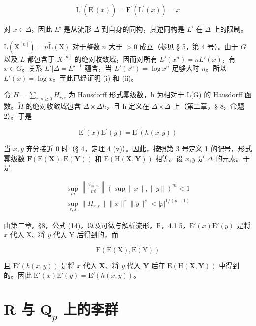 \[
\mathrm{L} ^ {\prime} (\mathrm{E} ^ {\prime} (x)) = \mathrm{E} ^ {\prime} (\mathrm{L} ^ {\prime} (x)) = x
\]

对 \(x \in \Delta\)。因此 \(E'\) 是从流形 \(\Delta\) 到自身的同构，其逆同构是 \(L'\) 在 \(\Delta\) 上的限制。

\(\mathrm{L}(\mathrm{X}^{[n]}) = n\tilde{\mathrm{L}}(\mathrm{X})\) 对于整数 \(n\) 大于 \(> 0\) 成立（参见 § 5，第 4 号）。由于 \(G\) 以及 \(L\) 都包含于 \(X^{[n]}\) 的绝对收敛域，因而对所有 \(L'(x^n) = nL'(x)\)，有 \(x \in G\)。关系 \(L'| \Delta = E'^{-1}\) 蕴含，当 \(L'(x^n) = \log x^n\) 足够大时 \(n\)。所以 \(L'(x) = \log x\)。至此已经证明 (i) 和 (ii)。

令 \(H = \sum_{r,s \geq 0} H_{r,s}\) 为 Hausdorff 形式幂级数，h 为相对于 L(G) 的 Hausdorff 函数。\(\tilde{H}\) 的绝对收敛域包含 \(\Delta \times \Delta\)\(h\)，且 h 定义在 \(\Delta \times \Delta\) 上（第二章，§ 8，命题 2）。于是

\[
\mathrm{E} ^ {\prime} (x) \mathrm{E} ^ {\prime} (y) = \mathrm{E} ^ {\prime} (h (x, y))
\]

当 \(x, y\) 充分接近 0 时（§ 4，定理 4 (v)）。因此，按照第 3 号定义 1 的记号，形式幂级数 \(\mathbf{F}(\mathrm{E}(\mathbf{X}), \mathrm{E}(\mathbf{Y}))\) 和 \(\mathrm{E}(\mathrm{H}(\mathbf{X}, \mathbf{Y}))\) 相等。设 \(x, y\) 是 \(\Delta\) 的元素。于是

\[
\begin{array}{l} \sup _ {m} \left\| \frac {\psi_ {m , m}}{m !} \right\| (\sup \| x \|, \| y \|) ^ {m} <   1 \\ \sup _ {r, s} \| H _ {r, s} \| \| x \| ^ {r} \| y \| ^ {s} <   | p | ^ {1 / (p - 1)} \end{array}
\]

由第二章，§8，公式 (14)，以及可微与解析流形，R，4.1.5，\(\mathrm{E}'(x)\mathrm{E}'(y)\) 是将 \(x\) 代入 X、将 \(y\) 代入 Y 后得到的，而

\[
\mathrm{F} (\mathrm{E} (\mathrm{X}), \mathrm{E} (\mathrm{Y}))
\]

且 \(\mathrm{E}'(h(x,y))\) 是将 \(x\) 代入 \(\mathbf{X}\)、将 \(y\) 代入 \(\mathbf{Y}\) 后在 \(\mathrm{E}(\mathrm{H}(\mathbf{X},\mathbf{Y}))\) 中得到的。因此 \(\mathrm{E}'(x)\mathrm{E}'(y) = \mathrm{E}'(h(x,y))\)。

\section{\texorpdfstring{R 与 \(\mathbf{Q}_p\) 上的李群}{R 与 \textbackslash mathbf\{Q\}\_p 上的李群}}

